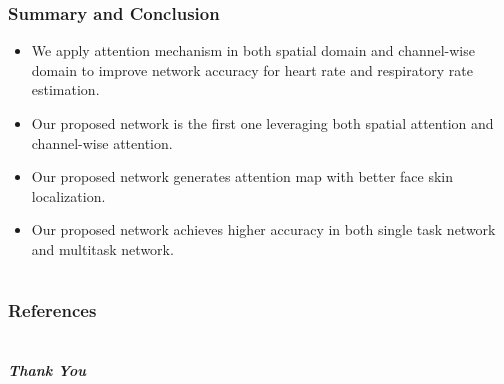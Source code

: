 \documentclass[aspectratio=169, table]{beamer}
\begin{document}
\begin{frame}
	\frametitle{\textbf{Summary and Conclusion}}
	\large
\begin{itemize}
		\item  We apply attention mechanism in both spatial domain and channel-wise domain to improve network accuracy for heart rate and respiratory rate estimation.\\[2mm]
		\item Our proposed  network  is  the  first  one  leveraging  both  spatial attention  and  channel-wise  attention.\\[2mm]
		\item Our proposed network generates attention map with better face skin localization.\\[2mm]
		\item Our proposed network achieves higher accuracy in both single task network and multitask network.\\[2mm]
\end{itemize}

\end{frame}
\section*{}
\begin{frame}
\frametitle{\textbf{References}}

\vspace*{0mm}
{\small


}
\end{frame}

\section*{}
\begin{frame}
\frametitle{\textcolor[rgb]{0.00,0.00,0.00}{}}

\vspace*{0mm}

\begin{center}
\Large{\emph{\textbf{Thank You}}}
\end{center}



\end{frame}
\end{document}
